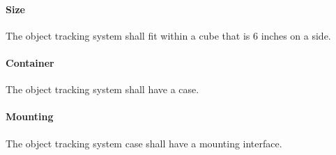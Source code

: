 \paragraph{Size}
The object tracking system shall fit within a cube that is 6 inches on a side.

\paragraph{Container}
The object tracking system shall have a case. 

\paragraph{Mounting}
The object tracking system case shall have a mounting interface. 


%
%
%
%
%
%
%
